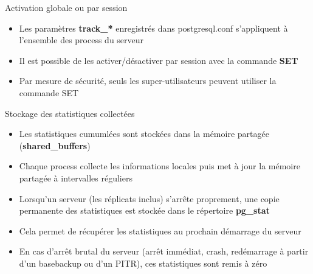 
\begin{frame}[fragile]{Activation globale ou par session}

   \begin{itemize}
      \item Les paramètres \textbf{track\_*} enregistrés dans postgresql.conf s'appliquent à l'ensemble des process du serveur
      \item Il est possible de les activer/désactiver par session avec la commande \textbf{SET}
      \item Par mesure de sécurité, seuls les super-utilisateurs peuvent utiliser la commande SET
   \end{itemize}

\begin{toile}
\end{toile}

\end{frame}


\begin{frame}[fragile]{Stockage des statistiques collectées}

   \begin{itemize}
      \item Les statistiques cumumlées sont stockées dans la mémoire partagée (\textbf{shared\_buffers})
      \item Chaque process collecte les informations locales puis met à jour la mémoire partagée à intervalles réguliers
      \item Lorsqu'un serveur (les réplicats inclus) s'arrête proprement, une copie permanente des statistiques est stockée dans le répertoire \textbf{pg\_stat}
      \item Cela permet de récupérer les statistiques au prochain démarrage du serveur
      \item En cas d'arrêt brutal du serveur (arrêt immédiat, crash, redémarrage à partir d'un basebackup ou d'un PITR), ces statistiques sont remis à zéro
   \end{itemize}

\end{frame}


